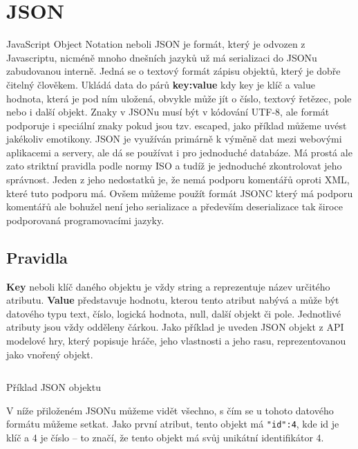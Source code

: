 \section{JSON}\label{sec:formats:json}
JavaScript Object Notation neboli JSON je formát, který je odvozen z Javascriptu, nicméně mnoho dnešních jazyků už má serializaci do JSONu zabudovanou interně. Jedná se o textový formát zápisu objektů, který je dobře čitelný člověkem. Ukládá data do párů \textbf{key:value} kdy key je klíč a value hodnota, která je pod ním uložená, obvykle může jít o číslo, textový řetězec, pole nebo i další objekt. Znaky v JSONu musí být v kódování UTF-8, ale formát podporuje i speciální znaky pokud jsou tzv. \gls{escaped}, jako příklad můžeme uvést jakékoliv emotikony. JSON je využíván primárně k výměně dat mezi webovými aplikacemi a servery, ale dá se používat i pro jednoduché databáze. Má prostá ale zato striktní pravidla podle normy ISO \cite[ISO21778]{ISO71616} a tudíž je jednoduché zkontrolovat jeho správnost. Jeden z jeho nedostatků je, že nemá podporu komentářů oproti XML, které tuto podporu má. Ovšem můžeme použít formát JSONC který má podporu komentářů ale bohužel není jeho serializace a především deserializace tak široce podporovaná programovacími jazyky.\cite[]{enwiki:1217773005}\cite[]{zapierDataFormats}


\subsection{Pravidla}\label{sec:formats:json:rules}
\textbf{Key} neboli klíč daného objektu je vždy string a reprezentuje název určitého atributu. \textbf{Value} představuje hodnotu, kterou tento atribut nabývá a může být datového typu text, číslo, logická hodnota, null, další objekt či pole. Jednotlivé atributy jsou vždy odděleny čárkou. Jako příklad je uveden JSON objekt z API modelové hry, který popisuje hráče, jeho vlastnosti a jeho rasu, reprezentovanou jako vnořený objekt.

\begin{listing}[ht!]
    \inputminted{json}{resources/code/standards/player.json}
    \caption{Příklad JSON objektu}
    \label{code:json_player}
\end{listing}

V níže přiloženém JSONu  můžeme vidět všechno, s čím se u tohoto datového formátu můžeme setkat. Jako první atribut, tento objekt má \verb|"id":4|, kde id je klíč a 4 je číslo -- to značí, že tento objekt má svůj unikátní identifikátor 4.

